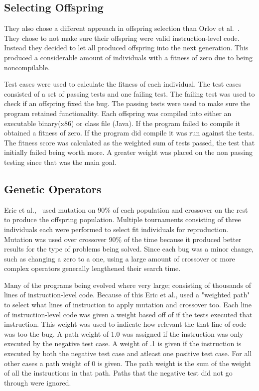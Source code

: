 \documentclass{sig-alternate}
\begin{document}
\subsection{Selecting Offspring } 
They also chose a different approach in offspring selection than Orlov et al.~\cite{FINCH:2011}. They chose to not make sure their offspring were valid instruction-level code. Instead they decided to let all produced offspring into the next generation. This produced a considerable amount of individuals with a fitness of zero due to being noncompilable.

Test cases were used to calculate the fitness of each individual. The test cases consisted of a set of passing tests and one failing test. The failing test was used to check if an offspring fixed the bug. The passing tests were used to make sure the program retained functionality. Each offspring was compiled into either an executable binary(x86) or class file (Java). If the program failed to compile it obtained a fitness of zero. If the program did compile it was run against the tests. The fitness score was calculated as the weighted sum of tests passed, the test that initially failed being worth more. A greater weight was placed on the non passing testing since that was the main goal.

\subsection{Genetic Operators}
Eric et al.,~\cite{Assembly:2010} used mutation on 90\% of each population and crossover on the rest to produce the offspring population. Multiple tournaments consisting of three individuals each were performed to select fit individuals for reproduction. Mutation was used over crossover 90\% of the time because it produced better results for the type of problems being solved. Since each bug was a minor change, such as changing a zero to a one, using a large amount of crossover or more complex operators generally lengthened their search time.

Many of the programs being evolved where very large; consisting of thousands of lines of instruction-level code. Because of this Eric et al., used a "weighted path" to select what lines of instruction to apply mutation and crossover too. Each line of instruction-level code was given a weight based off of if the tests executed that instruction. This weight was used to indicate how relevant the that line of code was too the bug. A path weight of 1.0 was assigned if the instruction was only executed by the negative test case. A weight of .1 is given if the instruction is executed by both the negative test case and atleast one positive test case. For all other cases a path weight of 0 is given. The path weight is the sum of the weight of all the instructions in that path. Paths that the negative test did not go through were ignored.
\end{document}
